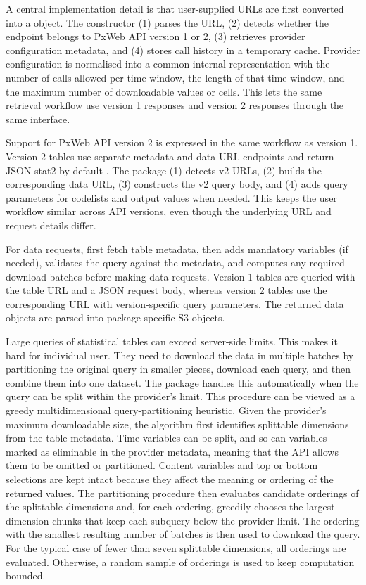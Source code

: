 A central implementation detail is that user-supplied URLs are first converted into a  object.
The constructor (1) parses the URL, (2) detects whether the endpoint belongs to PxWeb API version 1 or 2, (3) retrieves provider configuration metadata, and (4) stores call history in a temporary cache.
Provider configuration is normalised into a common internal representation with the number of calls allowed per time window, the length of that time window, and the maximum number of downloadable values or cells.
This lets the same retrieval workflow use version 1  responses and version 2  responses through the same interface.

Support for PxWeb API version 2 is expressed in the same workflow as version 1.
Version 2 tables use separate metadata and data URL endpoints and return JSON-stat2 by default \citep{PxToolsPxWeb2Intro}.
The  package (1) detects v2 URLs, (2) builds the corresponding data URL, (3) constructs the v2 query body, and (4) adds query parameters for codelists and output values when needed.
This keeps the user workflow similar across API versions, even though the underlying URL and request details differ.

For data requests,  first fetch table metadata, then adds mandatory variables (if needed), validates the query against the metadata, and computes any required download batches before making data requests.
Version 1 tables are queried with the table URL and a JSON request body, whereas version 2 tables use the corresponding  URL with version-specific query parameters.
The returned data objects are parsed into package-specific S3 objects.

Large queries of statistical tables can exceed server-side limits.
This makes it hard for individual user.
They need to download the data in multiple batches by partitioning the original query in smaller pieces, download each query, and then combine them into one dataset.
The  package handles this automatically when the query can be split within the provider's limit.
This procedure can be viewed as a greedy multidimensional query-partitioning heuristic.
Given the provider's maximum downloadable size, the algorithm first identifies splittable dimensions from the table metadata.
Time variables can be split, and so can variables marked as eliminable in the provider metadata, meaning that the API allows them to be omitted or partitioned.
Content variables and top or bottom selections are kept intact because they affect the meaning or ordering of the returned values.
The partitioning procedure then evaluates candidate orderings of the splittable dimensions and, for each ordering, greedily chooses the largest dimension chunks that keep each subquery below the provider limit.
The ordering with the smallest resulting number of batches is then used to download the query.
For the typical case of fewer than seven splittable dimensions, all orderings are evaluated.
Otherwise, a random sample of orderings is used to keep computation bounded.

